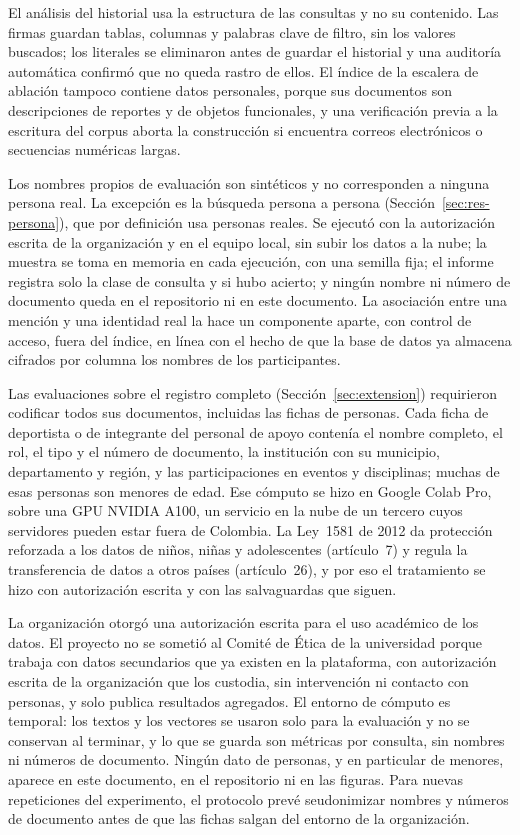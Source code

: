 \documentclass[11pt,letterpaper]{article}
\numberwithin{equation}{section}
\begin{document}
El análisis del historial usa la estructura de las consultas y no su contenido. Las firmas guardan tablas, columnas y palabras clave de filtro, sin los valores buscados; los literales se eliminaron antes de guardar el historial y una auditoría automática confirmó que no queda rastro de ellos. El índice de la escalera de ablación tampoco contiene datos personales, porque sus documentos son descripciones de reportes y de objetos funcionales, y una verificación previa a la escritura del corpus aborta la construcción si encuentra correos electrónicos o secuencias numéricas largas.

Los nombres propios de evaluación son sintéticos y no corresponden a ninguna persona real. La excepción es la búsqueda persona a persona (Sección~\ref{sec:res-persona}), que por definición usa personas reales. Se ejecutó con la autorización escrita de la organización y en el equipo local, sin subir los datos a la nube; la muestra se toma en memoria en cada ejecución, con una semilla fija; el informe registra solo la clase de consulta y si hubo acierto; y ningún nombre ni número de documento queda en el repositorio ni en este documento. La asociación entre una mención y una identidad real la hace un componente aparte, con control de acceso, fuera del índice, en línea con el hecho de que la base de datos ya almacena cifrados por columna los nombres de los participantes.

Las evaluaciones sobre el registro completo (Sección~\ref{sec:extension}) requirieron codificar todos sus documentos, incluidas las fichas de personas. Cada ficha de deportista o de integrante del personal de apoyo contenía el nombre completo, el rol, el tipo y el número de documento, la institución con su municipio, departamento y región, y las participaciones en eventos y disciplinas; muchas de esas personas son menores de edad. Ese cómputo se hizo en Google Colab Pro, sobre una GPU NVIDIA A100, un servicio en la nube de un tercero cuyos servidores pueden estar fuera de Colombia. La Ley~1581 de 2012 da protección reforzada a los datos de niños, niñas y adolescentes (artículo~7) y regula la transferencia de datos a otros países (artículo~26), y por eso el tratamiento se hizo con autorización escrita y con las salvaguardas que siguen.

La organización otorgó una autorización escrita para el uso académico de los datos. %
El proyecto no se sometió al Comité de Ética de la universidad porque trabaja con datos secundarios que ya existen en la plataforma, con autorización escrita de la organización que los custodia, sin intervención ni contacto con personas, y solo publica resultados agregados.
El entorno de cómputo es temporal: los textos y los vectores se usaron solo para la evaluación y no se conservan al terminar, y lo que se guarda son métricas por consulta, sin nombres ni números de documento. Ningún dato de personas, y en particular de menores, aparece en este documento, en el repositorio ni en las figuras. Para nuevas repeticiones del experimento, el protocolo prevé seudonimizar nombres y números de documento antes de que las fichas salgan del entorno de la organización.
\end{document}
